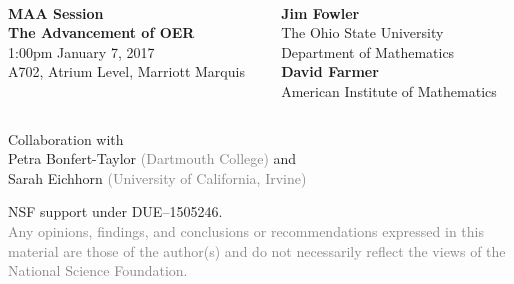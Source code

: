 \documentclass{chalkboard}
\begin{document}
\whitebackground

\clearbackgroundpicture
\begin{frame}[nofills]
  \vspace{5ex}

  \large
   \\[1ex]

  \vfill
  
  \color{osugray}

  \begin{columns}
    \begin{column}{0.49\textwidth}
      \large
      \vspace{2ex}

      \textbf{MAA Session} \\
      \textbf{The Advancement of OER} \\
      1:00pm January 7, 2017 \\
      A702, Atrium Level, Marriott Marquis

    \end{column}

    \hfill
    \begin{column}{0.5\textwidth}
      \large
      \textsf{\textbf{Jim Fowler}} \\
      \textsf{The Ohio State University} \\
      \textsf{Department of Mathematics} \\[2ex]

      \textsf{\textbf{David Farmer}} \\
      \textsf{American Institute of Mathematics} \\
    \end{column}

\end{columns}
  
\end{frame}

\begin{frame}
  \huge

  Collaboration with \\
  \quad Petra Bonfert-Taylor \textcolor{gray}{(Dartmouth College)} and \\
  \quad Sarah Eichhorn \textcolor{gray}{(University of California, Irvine)}

  \vfill

  NSF support under DUE--1505246. \\

  \textcolor{gray}{Any opinions, findings, and conclusions or
    recommendations expressed in this material are those of the
    author(s) and do not necessarily reflect the views of the National
    Science Foundation.}

\end{frame}
\end{document}
